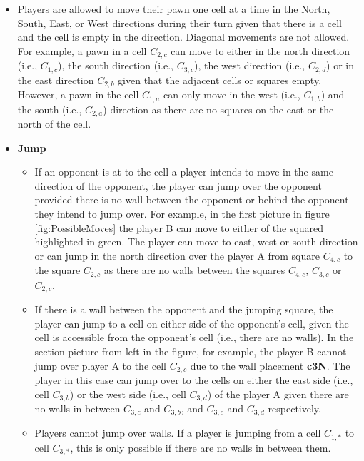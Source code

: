 \begin{itemize}
    \item Players are allowed to move their pawn one cell at a time in the North, South, East, or West directions during their turn given that there is a cell and the cell is empty in the direction. Diagonal movements are not allowed. For example, a pawn in a cell $C_{2, c}$ can move to either in the north direction (i.e., $C_{1, c}$), the south direction (i.e., $C_{3, c}$), the west direction (i.e., $C_{2, d}$) or in the east direction $C_{2, b}$ given that the adjacent cells or squares empty. However, a pawn in the cell $C_{1,a}$ can only move in the west (i.e., $C_{1,b}$) and the south (i.e., $C_{2,a}$) direction as there are no squares on the east or the north of the cell.

    \item \textbf{Jump}
    \begin{itemize}
        \item If an opponent is at to the cell a player intends to move in the same direction of the opponent, the player can jump over the opponent provided there is no wall between the opponent or behind the opponent they intend to jump over. For example, in the first picture in figure \ref{fig:PossibleMoves} the player B can move to either of the squared highlighted in green. The player can move to east, west or south direction or can jump in the north direction over the player A from square $C_{4,c}$ to the square $C_{2,c}$ as there are no walls between the squares $C_{4,c}$, $C_{3,c}$ or $C_{2,c}$.
        
        \item If there is a wall between the opponent and the jumping square, the player can jump to a cell on either side of the opponent's cell, given the cell is accessible from the opponent's cell (i.e., there are no walls). In the section picture from left in the figure, for example, the player B cannot jump over player A to the cell $C_{2, c}$ due to the wall placement \textbf{c3N}. The player in this case can jump over to the cells on either the east side (i.e., cell $C_{3, b}$) or the west side (i.e., cell $C_{3, d}$) of the player A given there are no walls in between $C_{3, c}$ and $C_{3, b}$, and $C_{3, c}$ and $C_{3, d}$ respectively.
            
        \item Players cannot jump over walls. If a player is jumping from a cell $C_{1,*}$ to cell $C_{3,*}$, this is only possible if there are no walls in between them.
    \end{itemize}
\end{itemize}


